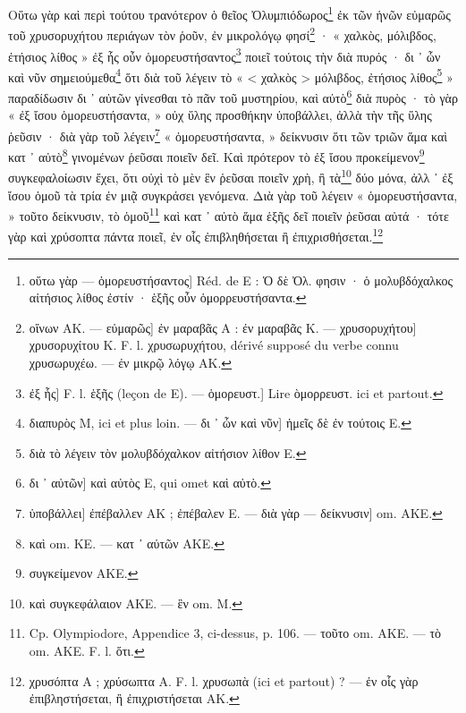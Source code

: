 \documentclass[a4paper, 11pt, oneside, polutonikogreek, french]{article}
\begin{document}
Οὕτω γὰρ καὶ περὶ τούτου τρανότερον ὁ θεῖος Ὀλυμπιόδωρος\footnote{οὕτω γὰρ --- ὁμορευστήσαντος] Réd. de E : Ὁ δὲ Ὀλ. φησιν · ὁ μολυβδόχαλκος αἰτήσιος λίθος ἐστίν · ἑξῆς οὖν ὁμορρευστήσαντα.} ἐκ τῶν ἡνῶν εὐμαρῶς τοῦ χρυσορυχήτου περιάγων τὸν ῥοῦν, ἐν μικρολόγῳ φησί\footnote{οἴνων AK. --- εὐμαρῶς] ἐν μαραβᾶς A : ἐν μαραβᾶς K. --- χρυσορυχήτου] χρυσορυχίτου K. F. l. χρυσωρυχήτου, dérivé supposé du verbe connu χρυσωρυχέω. --- ἐν μικρῷ λόγῳ AK.} · « χαλκὸς, μόλιβδος, ἐτήσιος λίθος » ἐξ ἧς οὖν ὁμορευστήσαντος\footnote{ἐξ ἧς] F. l. ἑξῆς (leçon de E). --- ὁμορευστ.] Lire ὸμορρευστ. ici et partout.} ποιεῖ τούτοις τὴν διὰ πυρός · δι ᾽ ὧν καὶ νῦν σημειούμεθα\footnote{διαπυρὸς M, ici et plus loin. --- δι ᾽ ὦν καὶ νῦν] ἡμεῖς δὲ ἐν τούτοις E.} ὅτι διὰ τοῦ λέγειν τὸ « < χαλκὸς > μόλιβδος, ἐτήσιος λίθος\footnote{διὰ τὸ λέγειν τὸν μολυβδόχαλκον αἰτήσιον λίθον E.} » παραδίδωσιν δι ᾽ αὐτῶν γίνεσθαι τὸ πᾶν τοῦ μυστηρίου, καὶ αὐτὸ\footnote{δι ᾽ αὐτῶν] καὶ αὐτὸς E, qui omet καὶ αὐτὸ.} διὰ πυρὸς · τὸ γὰρ « ἐξ ἴσου ὁμορευστήσαντα, » οὐχ ὕλης προσθήκην ὑποβάλλει, ἀλλὰ τὴν τῆς ὕλης ῥεῦσιν · διὰ γὰρ τοῦ λέγειν\footnote{ὑποβάλλει] ἐπέβαλλεν AK ; ἐπέβαλεν E. --- διὰ γὰρ --- δείκνυσιν] om. AKE.} « ὀμορευστήσαντα, » δείκνυσιν ὅτι τῶν τριῶν ἅμα καὶ κατ ᾽ αὐτὸ\footnote{καὶ om. KE. --- κατ ᾽ αὐτῶν AKE.} γινομένων ῥεῦσαι ποιεῖν δεῖ. Καὶ πρότερον τὸ ἐξ ἴσου προκείμενον\footnote{συγκείμενον AKE.} συγκεφαλοίωσιν ἔχει, ὅτι οὐχὶ τὸ μὲν ἓν ῥεῦσαι ποιεῖν χρὴ, ἢ τὰ\footnote{καὶ συγκεφάλαιον AKE. --- ἓν om. M.} δύο μόνα, ἀλλ ᾽ ἐξ ἴσου ὁμοῦ τὰ τρία ἐν μιᾷ συγκράσει γενόμενα. Διὰ γὰρ τοῦ λέγειν « ὁμορευστήσαντα, » τοῦτο δείκνυσιν, τὸ ὁμοῦ\footnote{Cp. Olympiodore, Appendice 3, ci-dessus, p. 106. --- τοῦτο om. AKE. --- τὸ om. AKE. F. l. ὅτι.} καὶ κατ ᾽ αὐτὸ ἅμα ἑξῆς δεῖ ποιεῖν ῥεῦσαι αὐτά · τότε γὰρ καὶ χρύσοπτα πάντα ποιεῖ, ἐν οἷς ἐπιβληθήσεται ἢ ἐπιχρισθήσεται.\footnote{χρυσόπτα A ; χρύσωπτα A. F. l. χρυσωπὰ (ici et partout) ? --- ἐν οἷς γὰρ ἐπιβληστήσεται, ἢ ἐπιχριστήσεται AK.}
\end{document}
